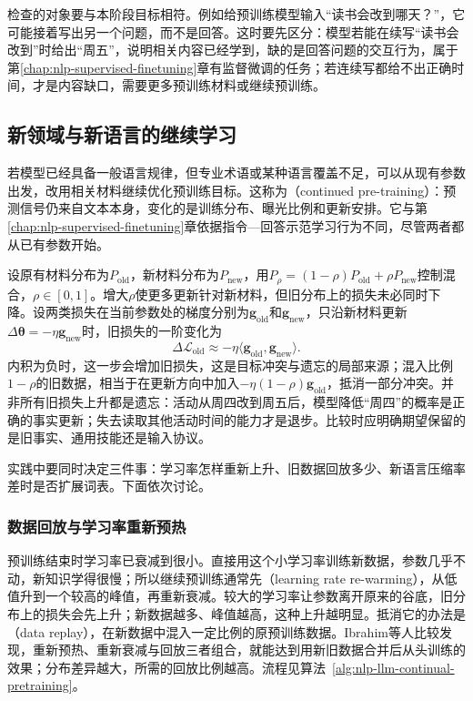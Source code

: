 检查的对象要与本阶段目标相符。例如给预训练模型输入“读书会改到哪天？”，它可能接着写出另一个问题，而不是回答。这时要先区分：模型若能在续写“读书会改到”时给出“周五”，说明相关内容已经学到，缺的是回答问题的交互行为，属于第\ref{chap:nlp-supervised-finetuning}章有监督微调的任务；若连续写都给不出正确时间，才是内容缺口，需要更多预训练材料或继续预训练。

\subsection{新领域与新语言的继续学习}
\label{sec:nlp-llm-domain-continuation}

若模型已经具备一般语言规律，但专业术语或某种语言覆盖不足，可以从现有参数出发，改用相关材料继续优化预训练目标。这称为（continued pre-training）：预测信号仍来自文本本身，变化的是训练分布、曝光比例和更新安排。它与第\ref{chap:nlp-supervised-finetuning}章依据指令—回答示范学习行为不同，尽管两者都从已有参数开始。

设原有材料分布为$P_{\mathrm{old}}$，新材料分布为$P_{\mathrm{new}}$，用$P_\rho=(1-\rho)P_{\mathrm{old}}+\rho P_{\mathrm{new}}$控制混合，$\rho\in[0,1]$。增大$\rho$使更多更新针对新材料，但旧分布上的损失未必同时下降。设两类损失在当前参数处的梯度分别为$\bm g_{\mathrm{old}}$和$\bm g_{\mathrm{new}}$，只沿新材料更新$\Delta\bm\theta=-\eta\bm g_{\mathrm{new}}$时，旧损失的一阶变化为
\begin{equation}
 \Delta\mathcal L_{\mathrm{old}}
 \approx-\eta\langle\bm g_{\mathrm{old}},\bm g_{\mathrm{new}}\rangle.
 \label{eq:nlp-llm-continuation-conflict}
\end{equation}
内积为负时，这一步会增加旧损失，这是目标冲突与遗忘的局部来源；混入比例$1-\rho$的旧数据，相当于在更新方向中加入$-\eta(1-\rho)\bm g_{\mathrm{old}}$，抵消一部分冲突。并非所有旧损失上升都是遗忘：活动从周四改到周五后，模型降低“周四”的概率是正确的事实更新；失去读取其他活动时间的能力才是退步。比较时应明确期望保留的是旧事实、通用技能还是输入协议。

实践中要同时决定三件事：学习率怎样重新上升、旧数据回放多少、新语言压缩率差时是否扩展词表。下面依次讨论。

\subsubsection{数据回放与学习率重新预热}
\label{sec:nlp-llm-replay-rewarm}

预训练结束时学习率已衰减到很小。直接用这个小学习率训练新数据，参数几乎不动，新知识学得很慢；所以继续预训练通常先（learning rate re-warming），从低值升到一个较高的峰值，再重新衰减。较大的学习率让参数离开原来的谷底，旧分布上的损失会先上升；新数据越多、峰值越高，这种上升越明显。抵消它的办法是（data replay），在新数据中混入一定比例的原预训练数据。Ibrahim等人比较发现，重新预热、重新衰减与回放三者组合，就能达到用新旧数据合并后从头训练的效果；分布差异越大，所需的回放比例越高。流程见算法~\ref{alg:nlp-llm-continual-pretraining}。

